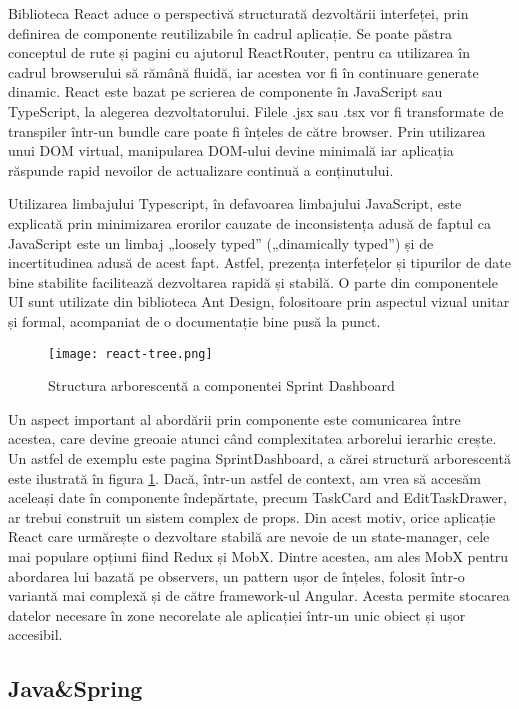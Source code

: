 Biblioteca React aduce o perspectivă structurată dezvoltării interfeței, prin definirea de componente reutilizabile în cadrul aplicație. Se poate păstra conceptul de rute și pagini cu ajutorul ReactRouter, pentru ca utilizarea în cadrul browserului să rămână fluidă, iar acestea vor fi în continuare generate dinamic. React este bazat pe scrierea de componente în JavaScript sau TypeScript, la alegerea dezvoltatorului. Filele .jsx sau .tsx vor fi transformate de transpiler într-un bundle care poate fi înțeles de către browser\cite{the_road_to_react}. Prin utilizarea unui DOM virtual, manipularea DOM-ului devine minimală iar aplicația răspunde rapid nevoilor de actualizare continuă a conținutului.

Utilizarea limbajului Typescript, în defavoarea limbajului JavaScript, este explicată prin minimizarea erorilor cauzate de inconsistența adusă de faptul ca JavaScript este un limbaj „loosely typed” („dinamically typed”) și de incertitudinea adusă de acest fapt. Astfel, prezența interfețelor și tipurilor de date bine stabilite facilitează dezvoltarea rapidă și stabilă. O parte din componentele UI sunt utilizate din biblioteca Ant Design, folositoare prin aspectul vizual unitar și formal, acompaniat de o documentație bine pusă la punct.

 \begin{figure}[H]
	\centering
 	 \texttt{[image: react-tree.png]}
	\caption{Structura arborescentă a componentei Sprint Dashboard}
	\label{fig:react-tree}
 \end{figure}

Un aspect important al abordării prin componente este comunicarea între acestea, care devine greoaie atunci când complexitatea arborelui ierarhic crește. Un astfel de exemplu este pagina SprintDashboard, a cărei structură arborescentă este ilustrată în figura \ref{fig:react-tree}. Dacă, într-un astfel de context, am vrea să accesăm aceleași date în componente îndepărtate, precum TaskCard and EditTaskDrawer, ar trebui construit un sistem complex de props. Din acest motiv, orice aplicație React care urmărește o dezvoltare stabilă are nevoie de un state-manager, cele mai populare opțiuni fiind Redux și MobX. Dintre acestea, am ales MobX pentru abordarea lui bazată pe observers, un pattern ușor de înțeles, folosit într-o variantă mai complexă și de către framework-ul Angular. Acesta permite stocarea datelor necesare în zone necorelate ale aplicației într-un unic obiect și ușor accesibil.

\subsection{Java\&Spring}

